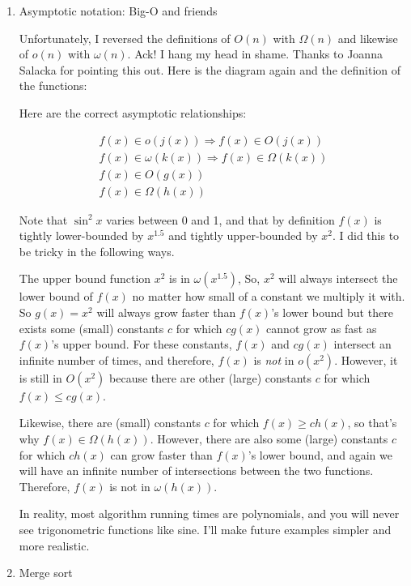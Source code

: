 \documentclass{article}[10pth]
\begin{document}
\begin{enumerate}
\pagebreak
\item{Asymptotic notation: Big-O and friends}

Unfortunately, I reversed the definitions of $O(n)$ with $\Omega(n)$ and
likewise of $o(n)$ with $\omega(n)$. Ack! I hang my head in shame. Thanks to
Joanna Salacka for pointing this out.
Here is the diagram again and the
definition of the functions:



Here are the correct asymptotic relationships:

\begin{eqnarray*}
f(x) \in o(j(x)) \Rightarrow f(x) \in O(j(x))\\
f(x) \in \omega(k(x)) \Rightarrow f(x) \in \Omega(k(x))\\
f(x) \in O(g(x))\\
f(x) \in \Omega(h(x))
\end{eqnarray*}

Note that $\sin^2{x}$ varies between 0 and 1, and that by definition $f(x)$ is
tightly lower-bounded by $x^{1.5}$ and tightly upper-bounded by $x^2$.
I did this to be tricky in the following ways.

The upper bound function $x^2$ is in $\omega(x^{1.5})$,
So, $x^2$ will always intersect the lower bound of $f(x)$ no matter
how small of a constant we multiply it with. So $g(x) = x^2$ will always grow faster
than $f(x)$'s lower bound but there exists some (small)
constants $c$ for which $cg(x)$ cannot grow as fast as $f(x)$'s upper bound.
For these
constants, $f(x)$ and $cg(x)$ intersect an infinite number of
times, and therefore, $f(x)$ is \textit{not} in $o(x^2)$.
However, it is still in $O(x^2)$ because there are other (large)
constants $c$ for
which $f(x) \le cg(x)$.

Likewise, there are (small) constants $c$ for which $f(x) \ge ch(x)$, so
that's why $f(x) \in \Omega(h(x))$. However, there are also some (large)
constants $c$ for which $ch(x)$ can grow faster than $f(x)$'s lower bound, and
again we will have an infinite number of intersections between the two
functions.
Therefore, $f(x)$ is not in $\omega(h(x))$.

In reality, most algorithm running times are polynomials, and you will never
see trigonometric functions like sine. I'll make future examples simpler and
more realistic.

\pagebreak
\item{Merge sort}\\


\end{enumerate}
\end{document}
